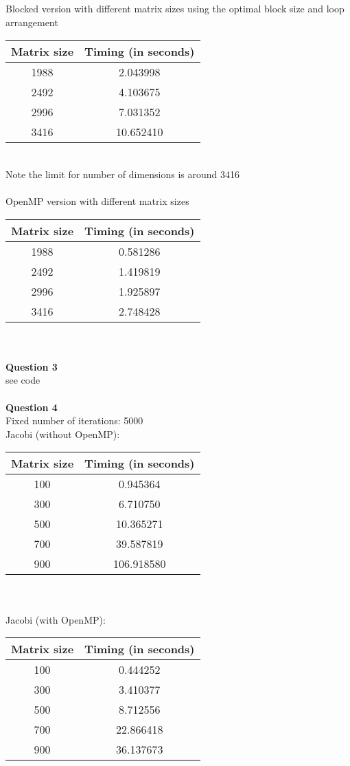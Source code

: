 \documentclass[12pt]{amsart}
\begin{document}
Blocked version with different matrix sizes using the optimal block size and loop arrangement
\vskip0.2cm
\begin{tabular}{|c |c|} 
 \hline
 Matrix size & Timing (in seconds) \\ [0.5ex] 
 \hline
 1988 & 2.043998 \\ 
 \hline
 2492 & 4.103675 \\
 \hline
 2996 & 7.031352 \\
 \hline
 3416 & 10.652410 \\[1ex] 
 \hline
\end{tabular}
\break\\
Note the limit for number of dimensions is around 3416\\
\\
OpenMP version with different matrix sizes
\vskip0.2cm
\begin{tabular}{|c |c|} 
 \hline
 Matrix size & Timing (in seconds) \\ [0.5ex] 
 \hline
 1988 & 0.581286 \\ 
 \hline
 2492 & 1.419819 \\
 \hline
 2996 & 1.925897 \\
 \hline
 3416 & 2.748428 \\ [1ex] 
 \hline
\end{tabular}
\break\\\\
\textbf{Question 3}\\
see code\\\\
\textbf{Question 4}\\
Fixed number of iterations: 5000\\
Jacobi (without OpenMP):\vskip0.2cm
\begin{tabular}{|c |c|} 
 \hline
 Matrix size & Timing (in seconds) \\ [0.5ex] 
 \hline
 100 & 0.945364 \\
 \hline
 300 & 6.710750 \\
 \hline
 500 & 10.365271 \\  
 \hline
 700 & 39.587819 \\  
 \hline
 900 & 106.918580 \\ [1ex] 
 \hline
 \end{tabular}
 \\\\
 Jacobi (with OpenMP):\vskip0.2cm
\begin{tabular}{|c |c|} 
 \hline
 Matrix size & Timing (in seconds) \\ [0.5ex] 
 \hline
 100 & 0.444252 \\
 \hline
 300 & 3.410377 \\
 \hline
 500 & 8.712556 \\  
 \hline
 700 & 22.866418 \\ 
 \hline
 900 & 36.137673 \\ [1ex] 
 \hline
\end{tabular}
\end{document}
